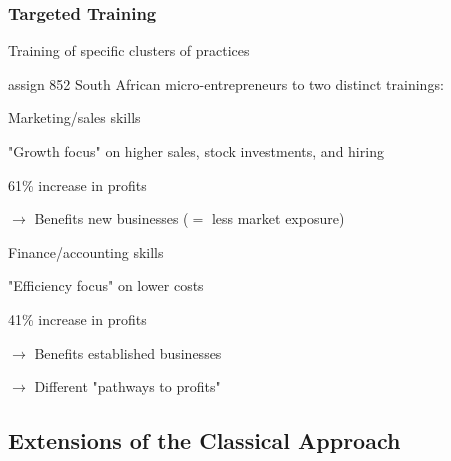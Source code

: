 \documentclass[hideothersubsections, usenames,dvipsnames,11pt]{beamer}
\newenvironment{itemize_2pt}{\itemize\addtolength{\itemsep}{2pt}}{\enditemize}
\newenvironment{enumerate_2pt}{\enumerate\addtolength{\itemsep}{2pt}}{\endenumerate}
\begin{document}
\begin{frame}
\frametitle{Targeted Training}

Training of specific clusters of practices
\begin{itemize_2pt}	
	\item \citet{Anderson2018} assign 852 South African micro-entrepreneurs to two distinct trainings:
	
	\vspace{0.5em}	
	
	\begin{enumerate_2pt}
	
		\item Marketing/sales skills
		\begin{itemize_2pt}
			\item "Growth focus" on higher sales, stock investments, and hiring
			\item 61\% increase in profits
			\item[] $\rightarrow$ Benefits new businesses ($=$ less market exposure)
		\end{itemize_2pt}		
		
		\item Finance/accounting skills
		
		\pause		
		
		\begin{itemize_2pt}
			\item "Efficiency focus" on lower costs
			\item 41\% increase in profits
			\item[] $\rightarrow$ Benefits established businesses
		\end{itemize_2pt}
			
	\end{enumerate_2pt}
	
		\item[] $\rightarrow$ Different "pathways to profits"

\end{itemize_2pt}

\end{frame}


\subsection{Extensions of the Classical Approach}
\end{document}
